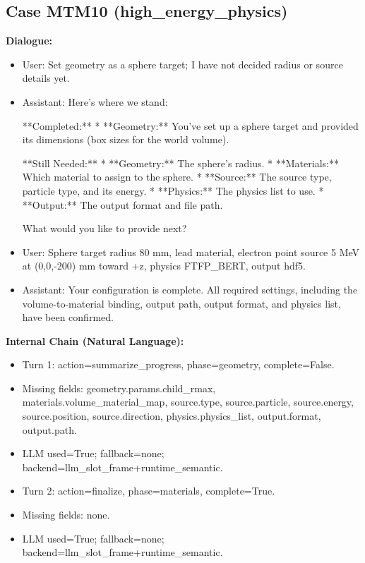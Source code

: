 \documentclass[11pt]{ctexart}
\begin{document}
\subsection{Case MTM10 (high\_energy\_physics)}
\textbf{Dialogue:}
\begin{itemize}
\item User: Set geometry as a sphere target; I have not decided radius or source details yet.
\item Assistant: Here's where we stand:

**Completed:**
*   **Geometry:** You've set up a sphere target and provided its dimensions (box sizes for the world volume).

**Still Needed:**
*   **Geometry:** The sphere's radius.
*   **Materials:** Which material to assign to the sphere.
*   **Source:** The source type, particle type, and its energy.
*   **Physics:** The physics list to use.
*   **Output:** The output format and file path.

What would you like to provide next?
\item User: Sphere target radius 80 mm, lead material, electron point source 5 MeV at (0,0,-200) mm toward +z, physics FTFP\_BERT, output hdf5.
\item Assistant: Your configuration is complete. All required settings, including the volume-to-material binding, output path, output format, and physics list, have been confirmed.
\end{itemize}
\textbf{Internal Chain (Natural Language):}
\begin{itemize}
\item Turn 1: action=summarize\_progress, phase=geometry, complete=False.
\item Missing fields: geometry.params.child\_rmax, materials.volume\_material\_map, source.type, source.particle, source.energy, source.position, source.direction, physics.physics\_list, output.format, output.path.
\item LLM used=True; fallback=none; backend=llm\_slot\_frame+runtime\_semantic.
\item Turn 2: action=finalize, phase=materials, complete=True.
\item Missing fields: none.
\item LLM used=True; fallback=none; backend=llm\_slot\_frame+runtime\_semantic.
\end{itemize}
\end{document}
